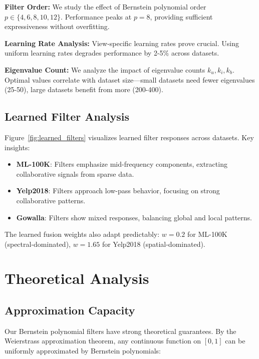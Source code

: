 \documentclass[10pt,twocolumn,letterpaper]{article}
\begin{document}
\textbf{Filter Order:} We study the effect of Bernstein polynomial order $p \in \{4, 6, 8, 10, 12\}$. Performance peaks at $p=8$, providing sufficient expressiveness without overfitting.

\textbf{Learning Rate Analysis:} View-specific learning rates prove crucial. Using uniform learning rates degrades performance by 2-5\% across datasets.

\textbf{Eigenvalue Count:} We analyze the impact of eigenvalue counts $k_u, k_i, k_b$. Optimal values correlate with dataset size—small datasets need fewer eigenvalues (25-50), large datasets benefit from more (200-400).

\subsection{Learned Filter Analysis}

Figure~\ref{fig:learned_filters} visualizes learned filter responses across datasets. Key insights:

\begin{itemize}
    \item \textbf{ML-100K}: Filters emphasize mid-frequency components, extracting collaborative signals from sparse data.
    
    \item \textbf{Yelp2018}: Filters approach low-pass behavior, focusing on strong collaborative patterns.
    
    \item \textbf{Gowalla}: Filters show mixed responses, balancing global and local patterns.
\end{itemize}

The learned fusion weights also adapt predictably: $w = 0.2$ for ML-100K (spectral-dominated), $w = 1.65$ for Yelp2018 (spatial-dominated).

\section{Theoretical Analysis}

\subsection{Approximation Capacity}

Our Bernstein polynomial filters have strong theoretical guarantees. By the Weierstrass approximation theorem, any continuous function on $[0,1]$ can be uniformly approximated by Bernstein polynomials:
\end{document}
